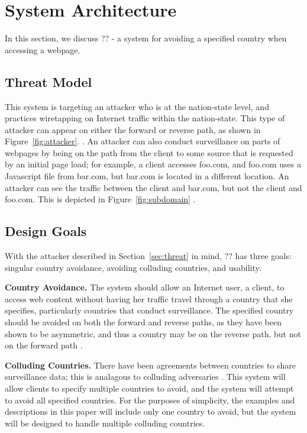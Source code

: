 \section{System Architecture}
\label{architecture}

In this section, we discuss ?? - a system for avoiding a specified country when accessing a webpage.

\subsection{Threat Model}
\label{threat}
This system is targeting an attacker who is at the nation-state level, and practices wiretapping on Internet traffic within the nation-state.  This type of attacker can appear on either the forward or reverse path, as shown in Figure~\ref{fig:attacker}. .  An attacker can also conduct surveillance on parts of webpages by being on the path from the client to some source that is requested by an initial page load; for example, a client accesses foo.com, and foo.com uses a Javascript file from bar.com, but bar.com is located in a different location.  An attacker can see the traffic between the client and bar.com, but not the client and foo.com.  This is depicted in Figure~\ref{fig:subdomain} .

\subsection{Design Goals}

With the attacker described in Section~\ref{sec:threat} in mind, ?? has three goals: singular country avoidance, avoiding colluding countries, and usability.  

{\bf Country Avoidance.}  The system should allow an Internet user, a client, to access web content without having her traffic travel through a country that she specifies, particularly countries that conduct surveillance.  The specified country should be avoided on both the forward and reverse paths, as they have been shown to be asymmetric, and thus a country may be on the reverse path, but not on the forward path .  

{\bf Colluding Countries.}  There have been agreements between countries to share surveillance data; this is analagous to colluding adversaries .  This system will allow clients to specify multiple countries to avoid, and the system will attempt to avoid all specified countries.  For the purposes of simplicity, the examples and descriptions in this paper will include only one country to avoid, but the system will be designed to handle multiple colluding countries.

